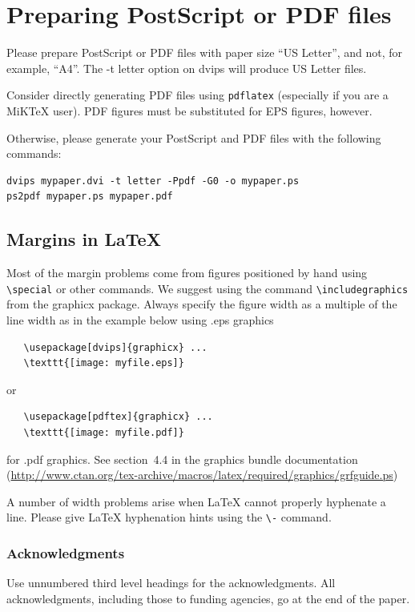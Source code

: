\documentclass{article} %
\begin{document}
\section{Preparing PostScript or PDF files}

Please prepare PostScript or PDF files with paper size ``US Letter'', and
not, for example, ``A4''. The -t
letter option on dvips will produce US Letter files.

Consider directly generating PDF files using \verb+pdflatex+
(especially if you are a MiKTeX user).
PDF figures must be substituted for EPS figures, however.

Otherwise, please generate your PostScript and PDF files with the following commands:
\begin{verbatim}
dvips mypaper.dvi -t letter -Ppdf -G0 -o mypaper.ps
ps2pdf mypaper.ps mypaper.pdf
\end{verbatim}

\subsection{Margins in LaTeX}

Most of the margin problems come from figures positioned by hand using
\verb+\special+ or other commands. We suggest using the command
\verb+\includegraphics+
from the graphicx package. Always specify the figure width as a multiple of
the line width as in the example below using .eps graphics
\begin{verbatim}
   \usepackage[dvips]{graphicx} ...
   \texttt{[image: myfile.eps]}
\end{verbatim}
or %
\begin{verbatim}
   \usepackage[pdftex]{graphicx} ...
   \texttt{[image: myfile.pdf]}
\end{verbatim}
for .pdf graphics.
See section~4.4 in the graphics bundle documentation (\url{http://www.ctan.org/tex-archive/macros/latex/required/graphics/grfguide.ps})

A number of width problems arise when LaTeX cannot properly hyphenate a
line. Please give LaTeX hyphenation hints using the \verb+\-+ command.


\subsubsection*{Acknowledgments}

Use unnumbered third level headings for the acknowledgments. All
acknowledgments, including those to funding agencies, go at the end of the paper.



\end{document}

